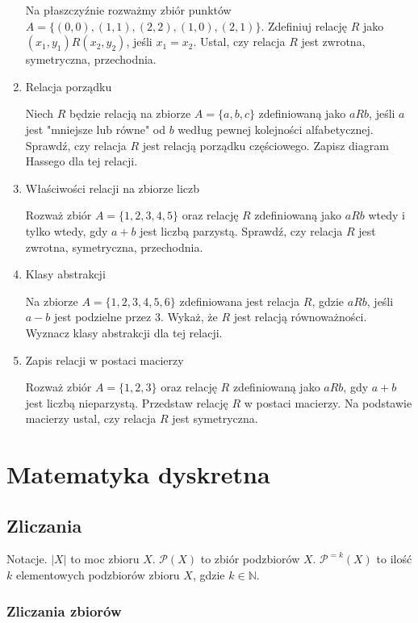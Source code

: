 \documentclass[12pt]{article}
\newcommand{\cP}{\mathcal{P}}
\newcommand{\bN}{\mathbb{N}}
\begin{document}
\begin{enumerate}
Na płaszczyźnie rozważmy zbiór punktów $ A = \{(0,0), (1,1), (2,2), (1,0), (2,1)\} $. Zdefiniuj relację $ R $ jako $ (x_1, y_1) R (x_2, y_2) $, jeśli $ x_1 = x_2 $.  
Ustal, czy relacja $ R $ jest zwrotna, symetryczna, przechodnia.

\item 
Relacja porządku  

Niech $ R $ będzie relacją na zbiorze $ A = \{a, b, c\} $ zdefiniowaną jako $ a R b $, jeśli $ a $ jest "mniejsze lub równe" od $ b $ według pewnej kolejności alfabetycznej.  
Sprawdź, czy relacja $ R $ jest relacją porządku częściowego.  
Zapisz diagram Hassego dla tej relacji.

\item 
 Właściwości relacji na zbiorze liczb  

Rozważ zbiór $ A = \{1, 2, 3, 4, 5\} $ oraz relację $ R $ zdefiniowaną jako $ a R b $ wtedy i tylko wtedy, gdy $ a + b $ jest liczbą parzystą.  
Sprawdź, czy relacja $ R $ jest zwrotna, symetryczna, przechodnia.  

\item 
Klasy abstrakcji  

Na zbiorze $ A = \{1, 2, 3, 4, 5, 6\} $ zdefiniowana jest relacja $ R $, gdzie $ a R b $, jeśli $ a - b $ jest podzielne przez 3.  
Wykaż, że $ R $ jest relacją równoważności.  
Wyznacz klasy abstrakcji dla tej relacji.

\item  Zapis relacji w postaci macierzy  

Rozważ zbiór $ A = \{1, 2, 3\} $ oraz relację $ R $ zdefiniowaną jako $ a R b $, gdy $ a + b $ jest liczbą nieparzystą.  
Przedstaw relację $ R $ w postaci macierzy.  
Na podstawie macierzy ustal, czy relacja $ R $ jest symetryczna.

\end{enumerate}

\section{Matematyka dyskretna}
\subsection{Zliczania}

Notacje. $|X|$ to moc zbioru $X$.
$\cP(X)$ to zbiór podzbiorów $X$.
$\cP^{=k}(X)$ to ilość $k$ elementowych podzbiorów 
zbioru $X$, gdzie $k\in\bN$.




\subsubsection{Zliczania zbiorów}
\end{document}
